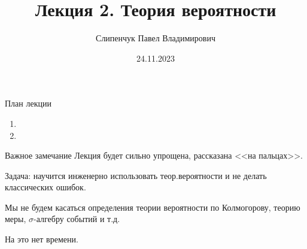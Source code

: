 
  

\title{Лекция 2. Теория вероятности}
\date{24.11.2023}
\author{Слипенчук Павел Владимирович}



  \maketitle
    
  \begin{frame}{План лекции}\label{frame:plan}
    \begin{enumerate}
	\item {}
	
	\item {}

	\end{enumerate}
 \end{frame}

\begin{frame}{Важное замечание}
Лекция будет сильно упрощена, 
рассказана
<<на пальцах>>.

Задача: научится инженерно использовать теор.вероятности и не делать классических ошибок.

Мы не будем касаться определения теории вероятности по Колмогорову,
теорию меры,
$\sigma$-алгебру событий 
и т.д.

На это нет времени.

\end{frame}
    
